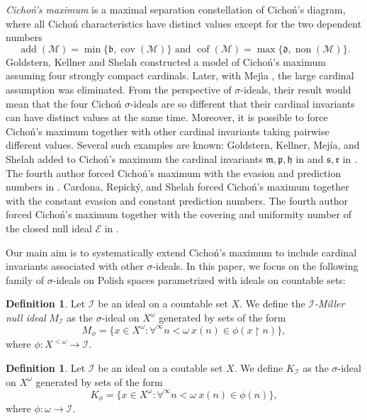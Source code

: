 \documentclass[a4paper,12pt]{amsart}
\theoremstyle{definition}
\newtheorem{dfn}[thm]{Definition}
\numberwithin{thm}{section}
\numberwithin{equation}{section}
\newcommand{\bb}{\mathfrak{b}}
\newcommand{\dd}{\mathfrak{d}}
\newcommand{\hh}{\mathfrak{h}}
\newcommand{\mm}{\mathfrak{m}}
\newcommand{\pp}{\mathfrak{p}}
\DeclareMathOperator{\non}{non}
\DeclareMathOperator{\cov}{cov}
\DeclareMathOperator{\add}{add}
\DeclareMathOperator{\cof}{cof}
\newcommand{\covm}{\cov(\mathcal{M})}
\newcommand{\nonm}{\non(\mathcal{M})}
\newcommand{\addm}{\add(\mathcal{M})}
\newcommand{\cofm}{\cof(\mathcal{M})}
\newcommand{\I}{\mathscr{I}}
\begin{document}
    \emph{Cicho\'{n}'s maximum} is a maximal separation constellation of Cicho\'n's diagram, where all Cicho\'n characteristics have distinct values except for the two dependent numbers
    \[
    \addm=\min\{\bb,\covm\}\text{ and }\cofm=\max\{\dd,\nonm\}.
    \]
    Goldstern, Kellner and Shelah \cite{GKS19} constructed a model of Cicho\'{n}'s maximum assuming four strongly compact cardinals. Later, with Mej\'{\i}a \cite{GKMS22}, the large cardinal assumption was eliminated.
    From the perspective of $\sigma$-ideals, their result would mean that the four Cicho\'n $\sigma$-ideals are so different that their cardinal invariants can have distinct values at the same time.
    Moreover, it is possible to force Cicho\'n's maximum together with other cardinal invariants taking pairwise different values. Several such examples are known: Goldstern, Kellner, Mej{\'i}a, and Shelah added to Cicho\'n's maximum the cardinal invariants $\mm, \pp, \hh$ in \cite{GKMS21a} and $\mathfrak{s},\mathfrak{r}$ in \cite{GKMS21b}. The fourth author forced Cicho\'n's maximum with the evasion and prediction numbers in \cite{Yam25}. Cardona, Repick{\'y}, and Shelah \cite{CRS25} forced Cicho\'n's maximum together with the constant evasion and constant prediction numbers. The fourth author forced Cicho\'n's maximum together with the covering and uniformity number of the closed null ideal $\mathcal{E}$ in \cite{Yam24}.

    Our main aim is to systematically extend Cicho\'n's maximum to include cardinal invariants associated with other $\sigma$-ideals. In this paper, we focus on the following family of $\sigma$-ideals on Polish spaces parametrized with ideals on countable sets:

    \begin{dfn}
        Let $\I$ be an ideal on a countable set $X$. We define the \emph{$\I$-Miller null ideal} $M_\I$ as the $\sigma$-ideal on $X^\omega$ generated by sets of the form
        \[
        M_\phi = \{x\in X^\omega:\forall^{\infty}n<\omega~x(n)\in\phi(x\upharpoonright n)\},
        \]
        where $\phi\colon X^{<\omega}\to\I$.
    \end{dfn}
    
    \begin{dfn}
        Let $\I$ be an ideal on a coutable set $X$. We define $K_\I$ as the $\sigma$-ideal on $X^\omega$ generated by sets of the form
        \[
        K_\phi = \{x\in X^\omega:\forall^{\infty}n<\omega~x(n)\in\phi(n)\},
        \]
        where $\phi\colon\omega\to\I$.
    \end{dfn}
    
\end{document}
